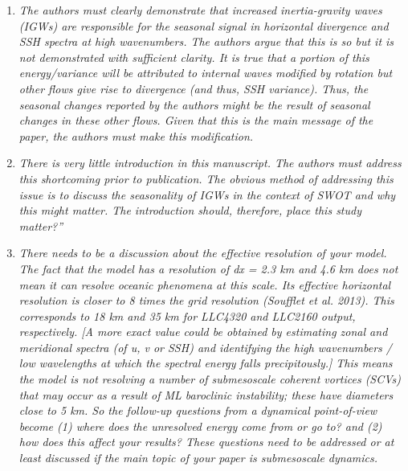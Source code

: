 \documentclass[11pt]{article}
\begin{document}
\begin{enumerate}

  \item {\it The authors must clearly demonstrate that increased inertia-gravity waves (IGWs) are
        responsible for the seasonal signal in horizontal divergence and SSH spectra at high
        wavenumbers. The authors argue that this is so but it is not demonstrated with sufficient
        clarity. It is true that a portion of this energy/variance will be attributed to internal waves
        modified by rotation but other flows give rise to divergence (and thus, SSH variance). Thus,
        the seasonal changes reported by the authors might be the result of seasonal changes in these
        other flows. Given that this is the main message of the paper, the authors must make this
        modification.}

  \item {\it There is very little introduction in this manuscript. The authors must address this
          shortcoming prior to publication. The obvious method of addressing this issue is to discuss
          the seasonality of IGWs in the context of SWOT and why this might matter. The introduction
          should, therefore, place this study matter?”}

  \item {\it There needs to be a discussion about the effective resolution of your model. The fact that
        the model has a resolution of dx = 2.3 km and 4.6 km does not mean it can resolve oceanic
        phenomena at this scale. Its effective horizontal resolution is closer to 8 times the grid
        resolution (Soufflet et al. 2013). This corresponds to 18 km and 35 km for LLC4320 and
        LLC2160 output, respectively. [A more exact value could be obtained by estimating zonal
        and meridional spectra (of u, v or SSH) and identifying the high wavenumbers / low
        wavelengths at which the spectral energy falls precipitously.] This means the model is not
        resolving a number of submesoscale coherent vortices (SCVs) that may occur as a result of
        ML baroclinic instability; these have diameters close to 5 km. So the follow-up questions
        from a dynamical point-of-view become (1) where does the unresolved energy come from or
        go to? and (2) how does this affect your results? These questions need to be addressed or at
        least discussed if the main topic of your paper is submesoscale dynamics.}


\end{enumerate}
\end{document}
